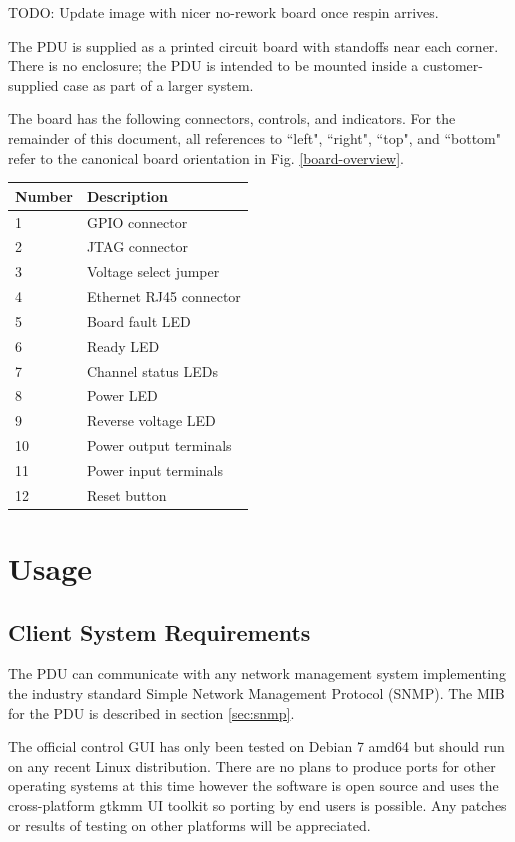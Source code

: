 \documentclass{article}
\begin{document}
TODO: Update image with nicer no-rework board once respin arrives.

The PDU is supplied as a printed circuit board with standoffs near each corner. There is no enclosure; the PDU is 
intended to be mounted inside a customer-supplied case as part of a larger system.

The board has the following connectors, controls, and indicators. For the remainder of this document, all references 
to ``left", ``right", ``top", and ``bottom" refer to the canonical board orientation in Fig. \ref{board-overview}.

\begin{longtable}{|l|p{4in}|}
\hline
{\bf Number} & {\bf Description}\\
\hline
1 & GPIO connector\\
\hline
2 & JTAG connector\\
\hline
3 & Voltage select jumper\\
\hline
4 & Ethernet RJ45 connector \\
\hline
5 & Board fault LED\\
\hline
6 & Ready LED\\
\hline
7 & Channel status LEDs\\
\hline
8 & Power LED\\
\hline
9 & Reverse voltage LED\\
\hline
10 & Power output terminals\\
\hline
11 & Power input terminals\\
\hline
12 & Reset button\\
\hline
\end{longtable}

\pagebreak
\section{Usage}

\subsection{Client System Requirements}

The PDU can communicate with any network management system implementing the industry standard Simple Network 
Management Protocol (SNMP). The MIB for the PDU is described in section \ref{sec:snmp}.

The official control GUI has only been tested on Debian 7 amd64 but should run on any recent Linux distribution. 
There are no plans to produce ports for other operating systems at this time however the software is open source and 
uses the cross-platform gtkmm UI toolkit so porting by end users is possible. Any patches or results of testing on 
other platforms will be appreciated.
\end{document}
